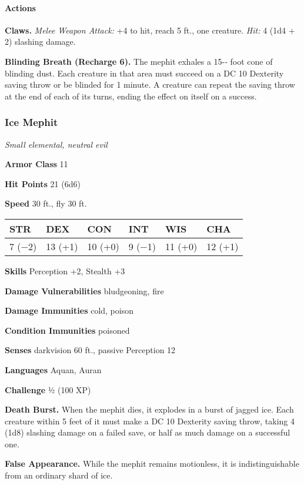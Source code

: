 \documentclass[
]{article}
\begin{document}
\hypertarget{actions-3}{%
\paragraph{Actions}\label{actions-3}}

\textbf{Claws.} \emph{Melee Weapon Attack:} +4 to hit, reach 5 ft., one
creature. \emph{Hit:} 4 (1d4 + 2) slashing damage.

\textbf{Blinding Breath (Recharge 6).} The mephit exhales a 15-­‐ foot
cone of blinding dust. Each creature in that area must succeed on a DC
10 Dexterity saving throw or be blinded for 1 minute. A creature can
repeat the saving throw at the end of each of its turns, ending the
effect on itself on a success.

\hypertarget{ice-mephit}{%
\subsubsection{Ice Mephit}\label{ice-mephit}}

\emph{Small elemental, neutral evil}

\textbf{Armor Class} 11

\textbf{Hit Points} 21 (6d6)

\textbf{Speed} 30 ft., fly 30 ft.

\begin{longtable}[]{@{}llllll@{}}
\toprule
STR & DEX & CON & INT & WIS & CHA\tabularnewline
\midrule
\endhead
7 (−2) & 13 (+1) & 10 (+0) & 9 (−1) & 11 (+0) & 12 (+1)\tabularnewline
\bottomrule
\end{longtable}

\textbf{Skills} Perception +2, Stealth +3

\textbf{Damage Vulnerabilities} bludgeoning, fire

\textbf{Damage Immunities} cold, poison

\textbf{Condition Immunities} poisoned

\textbf{Senses} darkvision 60 ft., passive Perception 12

\textbf{Languages} Aquan, Auran

\textbf{Challenge} ½ (100 XP)

\textbf{Death Burst.} When the mephit dies, it explodes in a burst of
jagged ice. Each creature within 5 feet of it must make a DC 10
Dexterity saving throw, taking 4 (1d8) slashing damage on a failed save,
or half as much damage on a successful one.

\textbf{False Appearance.} While the mephit remains motionless, it is
indistinguishable from an ordinary shard of ice.
\end{document}
